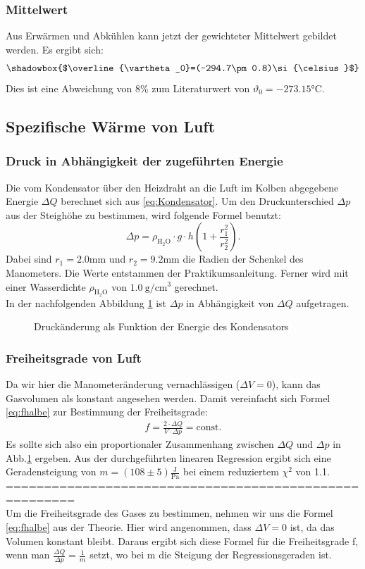 \documentclass[12pt,a4paper,titlepage,headinclude,bibtotoc]{scrartcl}
\begin{document}
\subsubsection{Mittelwert}
Aus Erwärmen und Abkühlen kann jetzt der gewichteter Mittelwert gebildet werden.
Es ergibt sich:
$$\shadowbox{$\overline{\vartheta_0}=(-294.7\pm0.8)\si{\celsius}$}$$
Dies ist eine Abweichung von 8\% zum Literaturwert von $\vartheta_0=-273.15\si{\celsius}$.

\subsection{Spezifische Wärme von Luft}
\subsubsection{Druck in Abhängigkeit der zugeführten Energie}
Die vom Kondensator über den Heizdraht an die Luft im Kolben abgegebene Energie $\Delta Q$ berechnet sich aus \eqref{eq:Kondensator}.
Um den Druckunterschied $\Delta p$ aus der Steighöhe zu bestimmen, wird folgende Formel benutzt: $$\Delta p = \rho_{\text{H}_2\text{O}} \cdot g \cdot h\left(1+\frac{r_1^2}{r_2^2}\right).$$
Dabei sind $r_1=2.0$mm und $r_2=9.2$mm die Radien der Schenkel des Manometers.
Die Werte entstammen der Praktikumsanleitung.
Ferner wird mit einer Wasserdichte $\rho_{\text{H}_2\text{O}}$ von $1.0~\si{\gram/\centi \meter^3}$ gerechnet.\\
In der nachfolgenden Abbildung \ref{fig:druckwarm} ist $\Delta p$ in Abhängigkeit von $\Delta Q$ aufgetragen.
\begin{figure}[!h]
	\centering
	
	\caption{Druckänderung als Funktion der Energie des Kondensators}
	\label{fig:druckwarm}
\end{figure}

\subsubsection{Freiheitsgrade von Luft}
Da wir hier die Manometeränderung vernachlässigen ($\Delta V=0$), kann das Gasvolumen als konstant angesehen werden.
Damit vereinfacht sich Formel \eqref{eq:fhalbe} zur Bestimmung der Freiheitsgrade:
\begin{align}
	f= \frac{2\cdot \Delta Q}{V\cdot \Delta p}=\text{const.}
\end{align}
Es sollte sich also ein proportionaler Zusammenhang zwischen $\Delta Q$ und $\Delta p$ in Abb.\ref{fig:druckwarm} ergeben.
Aus der durchgeführten linearen Regression ergibt sich eine Geradensteigung von $m=(108\pm5)\frac{\text{J}}{\text{Pa}}$
bei einem reduziertem $\chi^2$ von 1.1.
\\=======================================================\\
Um die Freiheitsgrade des Gases zu bestimmen, nehmen wir uns die Formel \eqref{eq:fhalbe}
aus der Theorie.
Hier wird angenommen, dass $\Delta V=0$ ist, da das Volumen konstant bleibt.
Daraus ergibt sich diese Formel für die Freiheitsgrade f, wenn man $\frac{\Delta Q}{\Delta p}=\frac1m$ setzt, wo bei m die Steigung der Regressionsgeraden ist.
\end{document}
